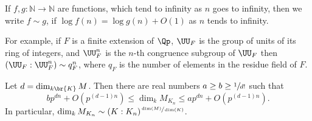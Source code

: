 If $f, g:\mathbb N\to \mathbb N$ are functions, which tend to infinity as $n$ goes to infinity, then we write $f\sim g$, if $\log f(n)=\log g(n) + O(1)$ as $n$ tends to infinity.

For example,
if $F$ is a finite extension of $\Qp$, $\UU_F$ is the group of units of its ring of integers, and $\UU_F^n$ is the $n$-th congruence subgroup of $\UU_F$ then
$(\UU_F: \UU_F^n)\sim q_F^n$, where $q_F$ is the number of elements in the residue field of $F$.
\begin{prop}\label{growth} Let $d=\dim_{k\br{K}} M$. Then there are real numbers $a\ge b\ge \sfrac{1}{d!}$ such that
\[
bp^{dn} + O(p^{(d-1)n})\le \dim_k M_{K_n}\le ap^{dn} + O(p^{(d-1)n}).
\]
In particular,
$\dim_k M_{K_n}\sim (K: K_n)^{\sfrac{\dim(M)} {\dim (K)}}$.
\end{prop}

